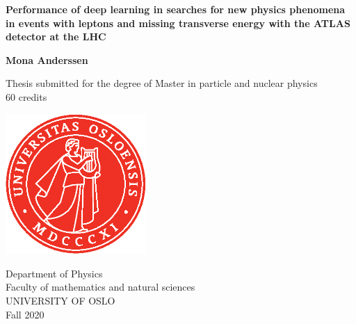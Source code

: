 \begin{titlepage}
   \begin{center}
       \vspace*{1cm}
 
       \LARGE{\textbf{Performance of deep learning in searches for new physics phenomena in events with leptons and missing transverse energy with the ATLAS detector at the LHC}}
 
       \vspace{0.5cm}
 
       \vspace{1.5cm}
 
       \large{\textbf{Mona Anderssen}}
 
       \vfill
 
       Thesis submitted for the degree of Master in particle and nuclear physics\\
       60 credits\\
 
       \vspace{0.8cm}
 
       \includegraphics[width=0.4\textwidth]{Figures/UiO_Segl_pms485.eps}
 
       Department of Physics\\
       Faculty of mathematics and natural sciences\\
       UNIVERSITY OF OSLO\\
       Fall 2020
 
   \end{center}
\end{titlepage}